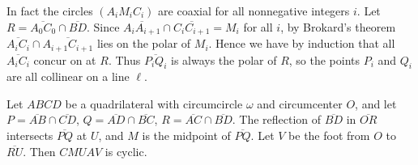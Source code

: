 In fact the circles $(A_iM_iC_i)$ are coaxial for all nonnegative integers $i$. Let $R=\overline{A_0C_0}\cap\overline{BD}$. Since $\overline{A_iA_{i+1}}\cap\overline{C_iC_{i+1}}=M_i$ for all $i$, by Brokard's theorem $\overline{A_iC_i}\cap\overline{A_{i+1}C_{i+1}}$ lies on the polar of $M_i$. Hence we have by induction that all $\overline{A_iC_i}$ concur on at $R$. Thus $\overline{P_iQ_i}$ is always the polar of $R$, so the points $P_i$ and $Q_i$ are all collinear on a line $\ell$.
\begin{lemma*}
    Let $ABCD$ be a quadrilateral with circumcircle $\omega$ and circumcenter $O$, and let $P=\overline{AB}\cap\overline{CD}$, $Q=\overline{AD}\cap\overline{BC}$, $R=\overline{AC}\cap\overline{BD}$. The reflection of $\overline{BD}$ in $\overline{OR}$ intersects $\overline{PQ}$ at $U$, and $M$ is the midpoint of $\overline{PQ}$. Let $V$ be the foot from $O$ to $\overline{RU}$. Then $CMUAV$ is cyclic.
\end{lemma*}
